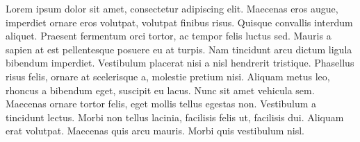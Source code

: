 \documentclass[11pt]{g-brief}
\begin{document}
\begin{g-brief}

Lorem ipsum dolor sit amet, consectetur adipiscing elit. Maecenas eros augue, imperdiet ornare eros volutpat, volutpat finibus risus. Quisque convallis interdum aliquet. Praesent fermentum orci tortor, ac tempor felis luctus sed. Mauris a sapien at est pellentesque posuere eu at turpis. Nam tincidunt arcu dictum ligula bibendum imperdiet. Vestibulum placerat nisi a nisl hendrerit tristique. Phasellus risus felis, ornare at scelerisque a, molestie pretium nisi. Aliquam metus leo, rhoncus a bibendum eget, suscipit eu lacus. Nunc sit amet vehicula sem. Maecenas ornare tortor felis, eget mollis tellus egestas non. Vestibulum a tincidunt lectus. Morbi non tellus lacinia, facilisis felis ut, facilisis dui. Aliquam erat volutpat. Maecenas quis arcu mauris. Morbi quis vestibulum nisl.

\end{g-brief}
\end{document}
